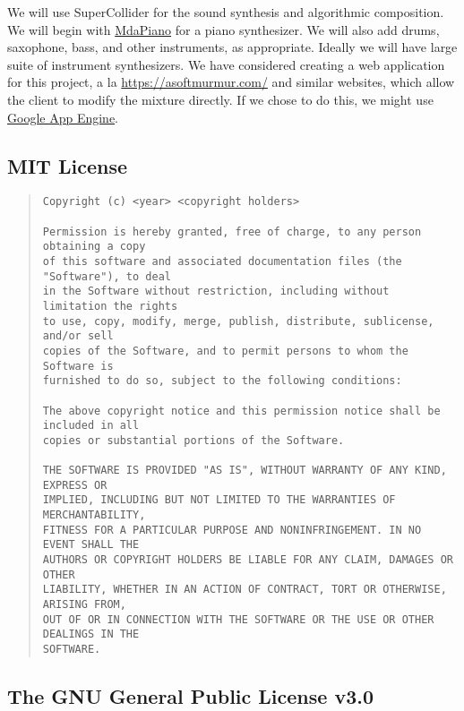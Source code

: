 \documentclass[12pt,a4paper]{article}
\begin{document}
We will use SuperCollider for the sound synthesis and algorithmic composition. We will begin with \href{http://doc.sccode.org/Classes/MdaPiano.html}{MdaPiano} for a piano synthesizer. We will also add drums, saxophone, bass, and other instruments, as appropriate. Ideally we will have large suite of instrument synthesizers. We have considered creating a web application for this project, a la \href{Soft Murmur}{https://asoftmurmur.com/} and similar websites, which allow the client to modify the mixture directly. If we chose to do this, we might use \href{https://console.cloud.google.com/projectselector/appengine}{Google App Engine}. 

\subsection{MIT License}

\begin{quote}
\begin{verbatim}
Copyright (c) <year> <copyright holders>

Permission is hereby granted, free of charge, to any person obtaining a copy
of this software and associated documentation files (the "Software"), to deal
in the Software without restriction, including without limitation the rights
to use, copy, modify, merge, publish, distribute, sublicense, and/or sell
copies of the Software, and to permit persons to whom the Software is
furnished to do so, subject to the following conditions:

The above copyright notice and this permission notice shall be included in all
copies or substantial portions of the Software.

THE SOFTWARE IS PROVIDED "AS IS", WITHOUT WARRANTY OF ANY KIND, EXPRESS OR
IMPLIED, INCLUDING BUT NOT LIMITED TO THE WARRANTIES OF MERCHANTABILITY,
FITNESS FOR A PARTICULAR PURPOSE AND NONINFRINGEMENT. IN NO EVENT SHALL THE
AUTHORS OR COPYRIGHT HOLDERS BE LIABLE FOR ANY CLAIM, DAMAGES OR OTHER
LIABILITY, WHETHER IN AN ACTION OF CONTRACT, TORT OR OTHERWISE, ARISING FROM,
OUT OF OR IN CONNECTION WITH THE SOFTWARE OR THE USE OR OTHER DEALINGS IN THE
SOFTWARE.
\end{verbatim}
\cite{mit-license}
\end{quote}

\subsection{The GNU General Public License v3.0}
\end{document}
